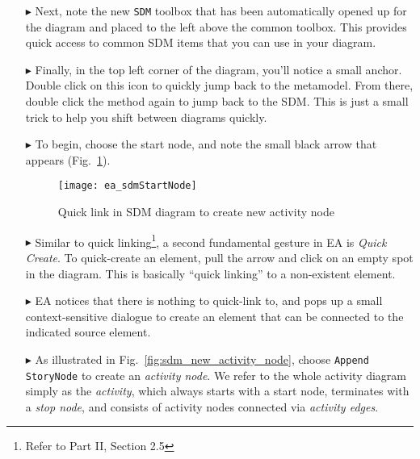 \begin{itemize}
\vspace{0.5cm}

\item[$\blacktriangleright$] Next, note the new \texttt{SDM} toolbox that has been automatically opened up for the diagram and placed to the left above
the common toolbox. This provides quick access to common SDM items that you can use in your diagram.

\vspace{0.5cm}

\item[$\blacktriangleright$] Finally, in the top left corner of the diagram, you'll notice a small anchor. Double click on this icon to quickly jump back to the
metamodel. From there, double click the method again to jump back to the SDM. This is just a small trick to help you shift between diagrams quickly. 

\vspace{0.5cm}

\item[$\blacktriangleright$] To begin, choose the start node, and note the small black arrow that appears (Fig.~\ref{fig:sdm_quicklink}). 

\newpage

\begin{figure}[htp]
\begin{center}
  \texttt{[image: ea\_sdmStartNode]}
  \caption{Quick link in SDM diagram to create new activity node}  
  \label{fig:sdm_quicklink}
\end{center}
\end{figure}

\item[$\blacktriangleright$] Similar to quick linking\footnote{Refer to Part II, Section 2.5}, a second fundamental gesture in EA is \emph{Quick Create}. To
quick-create an element, pull the arrow and click on an empty spot in the diagram. This is basically ``quick linking'' to a non-existent element.

\item[$\blacktriangleright$] EA notices that there is nothing to quick-link to, and pops up a small context-sensitive dialogue to create an element that can be
connected to the indicated source element.

\item[$\blacktriangleright$] As illustrated in Fig.~\ref{fig:sdm_new_activity_node}, choose \texttt{Append StoryNode} to create an \emph{activity
node}. We refer to the whole activity diagram simply as the \emph{activity}, which always starts with a start node, terminates with a \emph{stop node}, and
consists of activity nodes connected via \emph{activity edges}.


\end{itemize}
